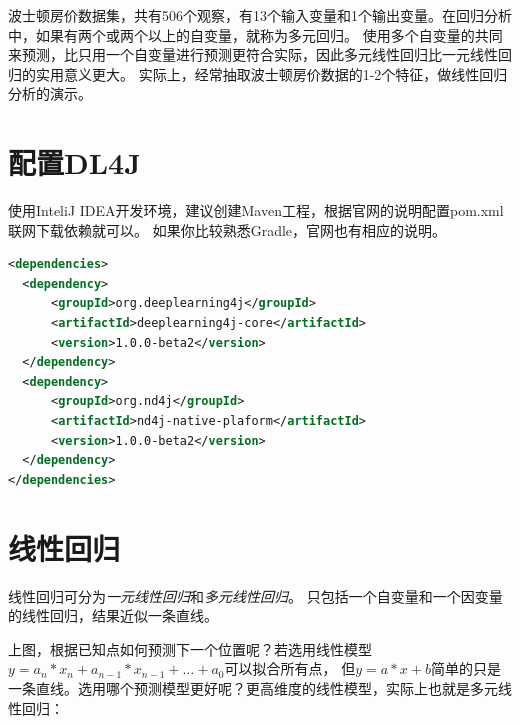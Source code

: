 波士顿房价数据集，共有506个观察，有13个输入变量和1个输出变量。在回归分析中，如果有两个或两个以上的自变量，就称为多元回归。
使用多个自变量的共同来预测，比只用一个自变量进行预测更符合实际，因此多元线性回归比一元线性回归的实用意义更大。
实际上，经常抽取波士顿房价数据的1-2个特征，做线性回归分析的演示。

\section{配置DL4J}
使用InteliJ IDEA开发环境，建议创建Maven工程，根据官网的说明配置pom.xml联网下载依赖就可以。
如果你比较熟悉Gradle，官网也有相应的说明。

\begin{lstlisting}[language=XML, caption={pom.xml}]
<dependencies>
  <dependency>
      <groupId>org.deeplearning4j</groupId>
      <artifactId>deeplearning4j-core</artifactId>
      <version>1.0.0-beta2</version>
  </dependency>
  <dependency>
      <groupId>org.nd4j</groupId>
      <artifactId>nd4j-native-plaform</artifactId>
      <version>1.0.0-beta2</version>
  </dependency>
</dependencies>
\end{lstlisting}


\section{线性回归}
线性回归可分为\emph{一元线性回归}和\emph{多元线性回归}。
只包括一个自变量和一个因变量的线性回归，结果近似一条直线。
\vspace{0.3cm}

\vspace{0.5cm}\noindent
上图，根据已知点如何预测下一个位置呢？若选用线性模型$y=a_n*x_n+a_{n-1}*x_{n-1}+\dots+a_0$可以拟合所有点，
但$y=a*x+b$简单的只是一条直线。选用哪个预测模型更好呢？更高维度的线性模型，实际上也就是多元线性回归：

